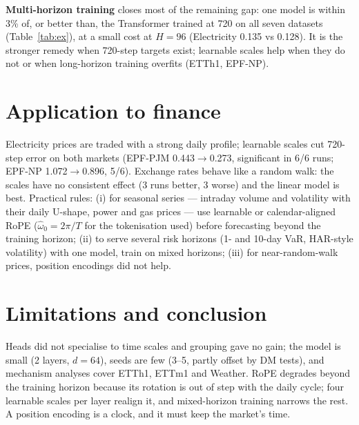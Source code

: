 \documentclass[12pt]{article}
\begin{document}
\textbf{Multi-horizon training} closes most of the remaining gap: one model is within 3\% of, or better than, the Transformer trained at 720 on all seven datasets (Table~\ref{tab:ex}), at a small cost at $H{=}96$ (Electricity 0.135 vs 0.128). It is the stronger remedy when 720-step targets exist; learnable scales help when they do not or when long-horizon training overfits (ETTh1, EPF-NP).

\section{Application to finance}
Electricity prices are traded with a strong daily profile; learnable scales cut 720-step error on both markets (EPF-PJM 0.443$\to$0.273, significant in 6/6 runs; EPF-NP 1.072$\to$0.896, 5/6).
Exchange rates behave like a random walk: the scales have no consistent effect (3 runs better, 3 worse) and the linear model is best.
Practical rules: (i) for seasonal series --- intraday volume and volatility with their daily U-shape, power and gas prices --- use learnable or calendar-aligned RoPE ($\hat\omega_0=2\pi/T$ for the tokenisation used) before forecasting beyond the training horizon; (ii) to serve several risk horizons (1- and 10-day VaR, HAR-style volatility) with one model, train on mixed horizons; (iii) for near-random-walk prices, position encodings did not help.

\section{Limitations and conclusion}
Heads did not specialise to time scales and grouping gave no gain; the model is small (2 layers, $d{=}64$), seeds are few (3--5, partly offset by DM tests), and mechanism analyses cover ETTh1, ETTm1 and Weather.
RoPE degrades beyond the training horizon because its rotation is out of step with the daily cycle; four learnable scales per layer realign it, and mixed-horizon training narrows the rest. A position encoding is a clock, and it must keep the market's time.
\end{document}
